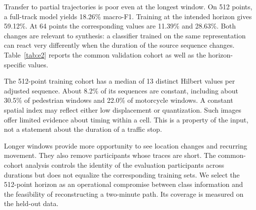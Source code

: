 Transfer to partial trajectories is poor even at the longest window. On 512 points, a full-track model yields 18.26\% macro-F1. Training at the intended horizon gives 59.12\%. At 64 points the corresponding values are 11.39\% and 28.63\%. Both changes are relevant to synthesis: a classifier trained on the same representation can react very differently when the duration of the source sequence changes. Table~\ref{tab:e2} reports the common validation cohort as well as the horizon-specific values.

The 512-point training cohort has a median of 13 distinct Hilbert values per adjusted sequence. About 8.2\% of its sequences are constant, including about 30.5\% of pedestrian windows and 22.0\% of motorcycle windows. A constant spatial index may reflect either low displacement or quantization. Such images offer limited evidence about timing within a cell. This is a property of the input, not a statement about the duration of a traffic stop.

Longer windows provide more opportunity to see location changes and recurring movement. They also remove participants whose traces are short. The common-cohort analysis controls the identity of the evaluation participants across durations but does not equalize the corresponding training sets. We select the 512-point horizon as an operational compromise between class information and the feasibility of reconstructing a two-minute path. Its coverage is measured on the held-out data.

